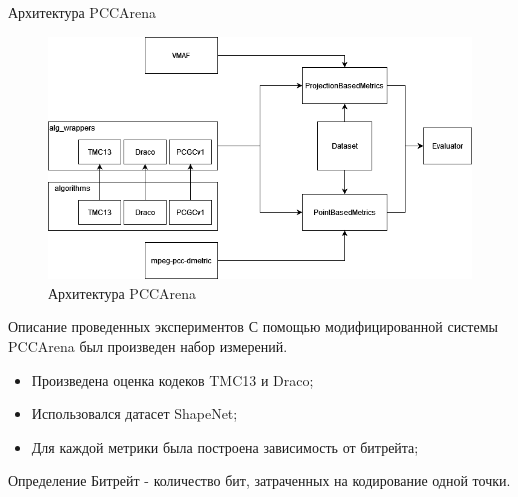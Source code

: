 \documentclass[aspectratio=169]{beamer}
\begin{document}
  \begin{frame}{Архитектура PCCArena}
    \begin{figure}[H]
        \centering
        \includegraphics[width=0.7\linewidth]{assets/pcc_arena_architecture.png}
        \caption{Архитектура PCCArena}
        \label{img:pcc_arena_architecture}
    \end{figure}
  \end{frame}

  \begin{frame}{Описание проведенных экспериментов}
    С помощью модифицированной системы PCCArena был произведен набор измерений.

    \begin{itemize}
      \item Произведена оценка кодеков TMC13 и Draco;
      \item Использовался датасет ShapeNet;
      \item Для каждой метрики была построена зависимость от битрейта;
    \end{itemize}

    \begin{block}{Определение}
      Битрейт - количество бит, затраченных на кодирование одной точки.
    \end{block}
  \end{frame}
\end{document}
